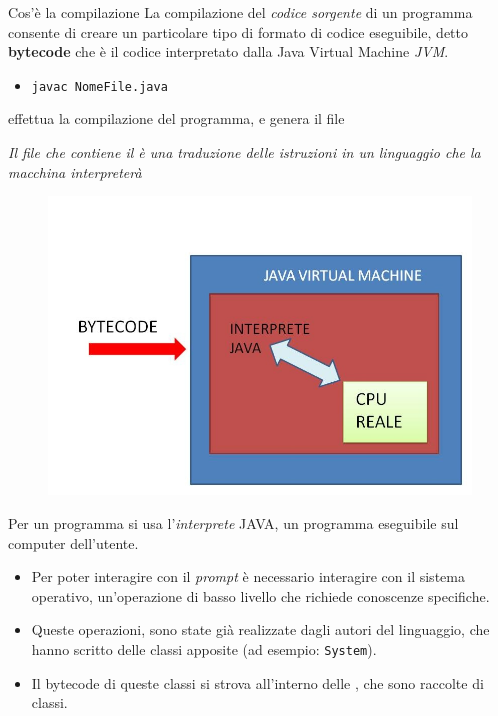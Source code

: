 \begin{frame}
\begin{block}{Cos'è la compilazione}
La compilazione del \textit{codice sorgente} di un programma consente di creare un particolare tipo di formato
di codice eseguibile, detto \textbf{bytecode} che è il codice interpretato dalla Java Virtual Machine
\textit{JVM}.
\end{block}
\begin{block}{}
\begin{itemize}
\item \texttt{javac NomeFile.java }
\end{itemize}
effettua la compilazione del programma, e genera il file 
\end{block}
\begin{block}{}
\textit{Il file che contiene il  è una traduzione delle istruzioni in un linguaggio che la macchina
interpreterà}
\end{block}
\end{frame}
\begin{frame}
\begin{figure}
\includegraphics[scale=0.4]{images/jvm.jpg}
\end{figure}
\begin{block}{}
Per  un programma si usa l'\textit{interprete} JAVA, un programma eseguibile sul computer dell'utente.
\end{block}
\end{frame}
\begin{frame}
\begin{block}{}
\begin{itemize}
\item Per poter interagire con il \textit{prompt} è necessario interagire con il sistema operativo, un'operazione di basso
livello che richiede conoscenze specifiche.
\item Queste operazioni, sono state già realizzate dagli autori del linguaggio, che hanno scritto delle classi apposite (ad esempio: \texttt{System}). 
\item Il bytecode di queste classi si strova all'interno delle , che sono raccolte di classi.
\end{itemize}
\end{block}
\end{frame}
